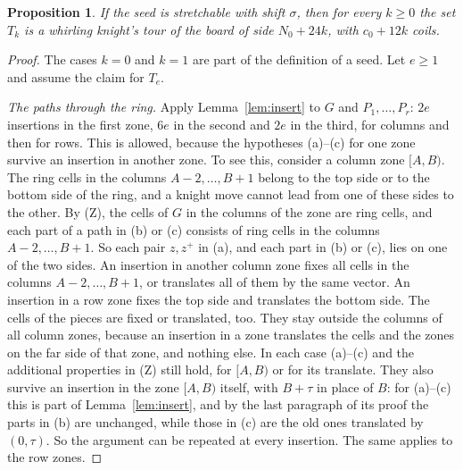 \documentclass[11pt]{amsart}
\newtheorem{proposition}[theorem]{Proposition}
\theoremstyle{remark}
\begin{document}
\begin{proposition}\label{prop:stretch}
If the seed is stretchable with shift $\sigma$, then for every $k\ge0$ the set $T_k$ is a whirling knight's tour of
the board of side $N_0+24k$, with $c_0+12k$ coils.
\end{proposition}
\begin{proof}
The cases $k=0$ and $k=1$ are part of the definition of a seed. Let $e\ge1$ and assume the claim for $T_e$.

\emph{The paths through the ring.} Apply Lemma~\ref{lem:insert} to $G$ and $P_1,\dots,P_r$: $2e$ insertions in the
first zone, $6e$ in the second and $2e$ in the third, for columns and then for rows. This is allowed, because the
hypotheses (a)--(c) for one zone survive an insertion in another zone. To see this, consider a column zone $[A,B)$.
The ring cells in the columns $A-2,\dots,B+1$ belong to the top side or to the bottom side of the ring, and a knight
move cannot lead from one of these sides to the other. By (Z), the cells of $G$ in the columns of the zone are ring
cells, and each part of a path in (b) or (c) consists of ring cells in the columns $A-2,\dots,B+1$. So each pair
$z,z^+$ in (a), and each part in (b) or (c), lies on one of the two sides. An insertion in another column zone fixes
all cells in the columns $A-2,\dots,B+1$, or translates all of them by the same vector. An insertion in a row zone
fixes the top side and translates the bottom side. The cells of the pieces are fixed or translated, too. They stay
outside the columns of all column zones, because an insertion in a zone translates the cells and the zones on the
far side of that zone, and nothing else. In each case (a)--(c) and the additional properties in (Z) still hold, for
$[A,B)$ or for its translate. They also survive an insertion in the zone $[A,B)$ itself, with $B+\tau$ in place of
$B$: for (a)--(c) this is part of Lemma~\ref{lem:insert}, and by the last paragraph of its proof the parts in (b) are
unchanged, while those in (c) are the old ones translated by $(0,\tau)$. So the argument can be repeated at every
insertion. The same applies to the row zones.


\end{proof}
\end{document}
